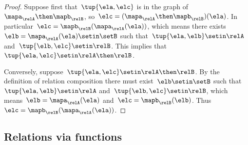 \begin{proof}
    Suppose first that~$\tup{\ela, \elc}$ is in the graph of~$\mapa_\relA \then \mapb_\relB$, so~$\elc = (\mapa_\relA \then \mapb_\relB)(\ela)$.
    In particular~$\elc =  \mapb_\relB(\mapa_\relA(\ela))$, which means there exists~$\elb = \mapa_\relA(\ela) \setin \setB$ such that~$\tup{\ela, \elb} \setin \relA$ and~$\tup{\elb, \elc} \setin \relB$.
    This implies that~$\tup{\ela, \elc} \setin \relA \then \relB$.

    Conversely, suppose~$\tup{\ela, \elc} \setin \relA \then \relB$.
    By the definition of relation composition there must exist~$\elb \setin \setB$ such that~$\tup{\ela, \elb} \setin \relA$ and~$\tup{\elb, \elc} \setin \relB$, which means~$\elb = \mapa_\relA(\ela)$ and~$\elc = \mapb_\relB(\elb)$.
    Thus~$\elc = \mapb_\relB(\mapa_\relA(\ela))$.
\end{proof}

\subsection{Relations via functions}

